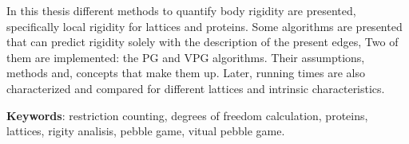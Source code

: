 In this thesis different methods to quantify body rigidity are presented, specifically local rigidity for lattices and proteins. Some algorithms are presented that can predict rigidity solely with the description of the present edges, Two of them are implemented: the PG and VPG algorithms. Their assumptions, methods and, concepts that make them up. Later, running times are also characterized and compared for different lattices and intrinsic characteristics.

\textbf{Keywords}: restriction counting, degrees of freedom calculation, proteins, lattices, rigity analisis, pebble game, vitual pebble game.
